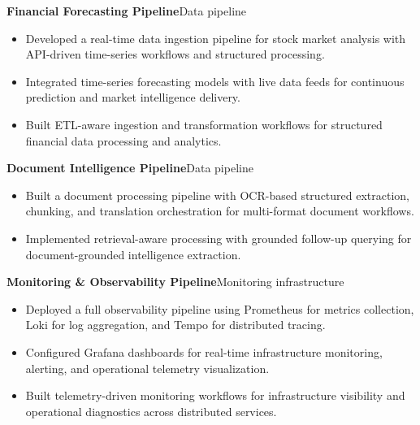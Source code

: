 \textbf{Financial Forecasting Pipeline}\hfill {\color{SecondaryText}\small Data pipeline}\par
\begin{itemize}
  \item Developed a real-time data ingestion pipeline for stock market analysis with API-driven time-series workflows and structured processing.
  \item Integrated time-series forecasting models with live data feeds for continuous prediction and market intelligence delivery.
  \item Built ETL-aware ingestion and transformation workflows for structured financial data processing and analytics.
\end{itemize}

\textbf{Document Intelligence Pipeline}\hfill {\color{SecondaryText}\small Data pipeline}\par
\begin{itemize}
  \item Built a document processing pipeline with OCR-based structured extraction, chunking, and translation orchestration for multi-format document workflows.
  \item Implemented retrieval-aware processing with grounded follow-up querying for document-grounded intelligence extraction.
\end{itemize}

\textbf{Monitoring \& Observability Pipeline}\hfill {\color{SecondaryText}\small Monitoring infrastructure}\par
\begin{itemize}
  \item Deployed a full observability pipeline using Prometheus for metrics collection, Loki for log aggregation, and Tempo for distributed tracing.
  \item Configured Grafana dashboards for real-time infrastructure monitoring, alerting, and operational telemetry visualization.
  \item Built telemetry-driven monitoring workflows for infrastructure visibility and operational diagnostics across distributed services.
\end{itemize}
